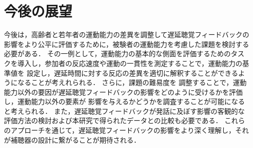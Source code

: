\section{今後の展望}
今後は，高齢者と若年者の運動能力の差異を調整して遅延聴覚フィードバックの影響をより公平に評価するために，被験者の運動能力を考慮した課題を検討する必要がある．
その一例として，運動能力の基本的な側面を評価するためのタスクを導入し，参加者の反応速度や運動の一貫性を測定することで，運動能力の基準値を
設定し，遅延時間に対する反応の差異を適切に解釈することができるようになることが考えれられる．
さらに，課題の難易度を
調整することで，運動能力以外の要因が遅延聴覚フィードバックの影響をどのように受けるかを評価し，運動能力以外の要素が
影響を与えるかどうかを調査することが可能になると考えられる．
また，遅延聴覚フィードバックが発話に及ぼす影響の客観的な評価方法の検討および本研究で得られたデータとの比較も必要である．
これらのアプローチを通じて，遅延聴覚フィードバックの影響をより深く理解し，それが補聴器の設計に繋がることが期待される．